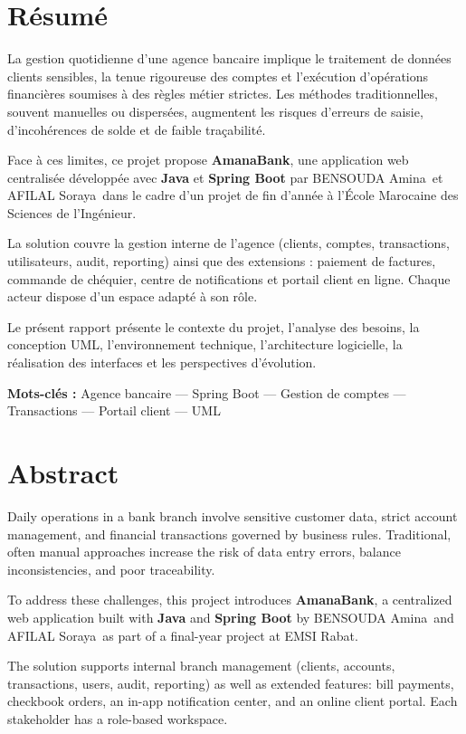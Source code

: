 \documentclass[11pt,a4paper,oneside]{report}
\newcommand{\etudianteun}{BENSOUDA Amina}
\newcommand{\etudiantedeux}{AFILAL Soraya}
\newcommand{\ecole}{École Marocaine des Sciences de l'Ingénieur}
\newcommand{\nomapplication}{AmanaBank}
\begin{document}
\chapter*{Résumé}

La gestion quotidienne d'une agence bancaire implique le traitement de données clients sensibles, la tenue rigoureuse des comptes et l'exécution d'opérations financières soumises à des règles métier strictes. Les méthodes traditionnelles, souvent manuelles ou dispersées, augmentent les risques d'erreurs de saisie, d'incohérences de solde et de faible traçabilité.

Face à ces limites, ce projet propose \textbf{\nomapplication}, une application web centralisée développée avec \textbf{Java} et \textbf{Spring Boot} par \etudianteun\ et \etudiantedeux\ dans le cadre d'un projet de fin d'année à l'\ecole.

La solution couvre la gestion interne de l'agence (clients, comptes, transactions, utilisateurs, audit, reporting) ainsi que des extensions : paiement de factures, commande de chéquier, centre de notifications et portail client en ligne. Chaque acteur dispose d'un espace adapté à son rôle.

Le présent rapport présente le contexte du projet, l'analyse des besoins, la conception UML, l'environnement technique, l'architecture logicielle, la réalisation des interfaces et les perspectives d'évolution.

\vspace{0.5cm}
\textbf{Mots-clés :} Agence bancaire — Spring Boot — Gestion de comptes — Transactions — Portail client — UML

\chapter*{Abstract}

Daily operations in a bank branch involve sensitive customer data, strict account management, and financial transactions governed by business rules. Traditional, often manual approaches increase the risk of data entry errors, balance inconsistencies, and poor traceability.

To address these challenges, this project introduces \textbf{\nomapplication}, a centralized web application built with \textbf{Java} and \textbf{Spring Boot} by \etudianteun\ and \etudiantedeux\ as part of a final-year project at EMSI Rabat.

The solution supports internal branch management (clients, accounts, transactions, users, audit, reporting) as well as extended features: bill payments, checkbook orders, an in-app notification center, and an online client portal. Each stakeholder has a role-based workspace.
\end{document}

